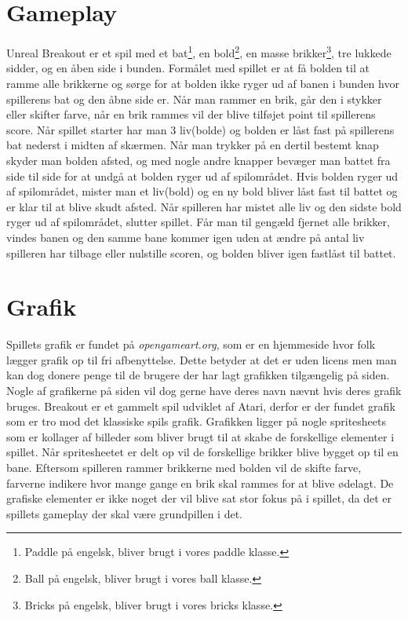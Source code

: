 
\section{Gameplay}
Unreal Breakout er et spil med et bat\footnote{Paddle på engelsk, bliver brugt i vores paddle klasse.}, en bold\footnote{Ball på engelsk, bliver brugt i vores ball klasse.}, en masse brikker\footnote{Bricks på engelsk, bliver brugt i vores bricks klasse.}, tre lukkede sidder, og en åben side i bunden. Formålet med spillet er at få bolden til at ramme alle brikkerne og sørge for at bolden ikke ryger ud af banen i bunden hvor spillerens bat og den åbne side er. Når man rammer en brik, går den i stykker eller skifter farve, når en brik rammes vil der blive tilføjet point til spillerens score. Når spillet starter har man 3 liv(bolde) og bolden er låst fast på spillerens bat nederst i midten af skærmen. Når man trykker på en dertil bestemt knap skyder man bolden afsted, og med nogle andre knapper bevæger man battet fra side til side for at undgå at bolden ryger ud af spilområdet. Hvis bolden ryger ud af spilområdet, mister man et liv(bold) og en ny bold bliver låst fast til battet og er klar til at blive skudt afsted. Når spilleren har mistet alle liv og den sidste bold ryger ud af spilområdet, slutter spillet. Får man til gengæld fjernet alle brikker, vindes banen og den samme bane kommer igen uden at ændre på antal liv spilleren har tilbage eller nulstille scoren, og bolden bliver igen fastlåst til battet.

\section{Grafik} 

Spillets grafik er fundet på \textit{opengameart.org}, som er en hjemmeside hvor folk lægger grafik op til fri afbenyttelse. Dette betyder at det er uden licens men man kan dog donere penge til de brugere der har lagt grafikken tilgængelig på siden. Nogle af grafikerne på siden vil dog gerne have deres navn nævnt hvis deres grafik bruges. \newline
Breakout er et gammelt spil udviklet af Atari, derfor er der fundet grafik som er tro mod det klassiske spils grafik. Grafikken ligger på nogle spritesheets som er kollager af billeder som bliver brugt til at skabe de forskellige elementer i spillet. Når spritesheetet er delt op vil de forskellige brikker blive bygget op til en bane. Eftersom spilleren rammer brikkerne med bolden vil de skifte farve, farverne indikere hvor mange gange en brik skal rammes for at blive ødelagt. De grafiske elementer er ikke noget der vil blive sat stor fokus på i spillet, da det er spillets gameplay der skal være grundpillen i det. 

